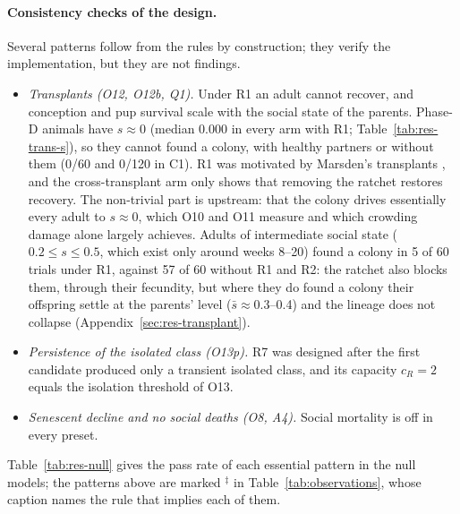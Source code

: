 \paragraph{Consistency checks of the design.}
Several patterns follow from the rules by construction; they verify the implementation, but they are not findings.
\begin{itemize}
\item \emph{Transplants (O12, O12b, Q1).} Under R1 an adult cannot recover, and conception and pup survival scale
  with the social state of the parents. Phase-D animals have $s\approx0$ (median 0.000 in every arm with R1;
  Table~\ref{tab:res-trans-s}), so they cannot found a colony, with healthy partners or without them (0/60 and 0/120
  in \textsf{C1}). R1 was motivated by Marsden's transplants \cite{Calhoun1973}, and the cross-transplant arm only
  shows that removing the ratchet restores recovery. The non-trivial part is upstream: that the colony drives
  essentially every adult to $s\approx0$, which O10 and O11 measure and which crowding damage alone largely
  achieves. Adults of intermediate social state
  ($0.2\le s\le0.5$, which exist only around weeks 8--20) found a colony in 5 of 60 trials under R1, against 57 of
  60 without R1 and R2: the ratchet also blocks them, through their fecundity, but where they do found a colony
  their offspring settle at the parents' level ($\bar s\approx0.3$--0.4) and the lineage does not collapse
  (Appendix~\ref{sec:res-transplant}).
\item \emph{Persistence of the isolated class (O13p).} R7 was designed after the first candidate produced only a
  transient isolated class, and its capacity $c_R=2$ equals the isolation threshold of O13.
\item \emph{Senescent decline and no social deaths (O8, A4).} Social mortality is off in every preset.
\end{itemize}
Table~\ref{tab:res-null} gives the pass rate of each essential pattern in the null models; the patterns above are
marked $^\ddagger$ in Table~\ref{tab:observations}, whose caption names the rule that implies each of them.

